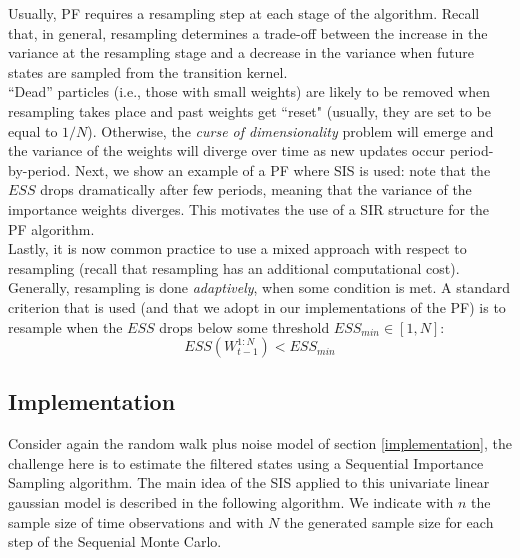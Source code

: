\documentclass[
]{book}
\theoremstyle{break}
\theoremstyle{nonumberplain}
\begin{document}
Usually, PF requires a resampling step at each stage of the algorithm.
Recall that, in general, resampling determines a trade-off between the
increase in the variance at the resampling stage and a decrease in the
variance when future states are sampled from the transition kernel.\\
``Dead'' particles (i.e., those with small weights) are likely to be
removed when resampling takes place and past weights get ``reset"
(usually, they are set to be equal to \(1/N\)). Otherwise, the
\textit{curse of dimensionality} problem will emerge and the variance of
the weights will diverge over time as new updates occur
period-by-period. Next, we show an example of a PF where SIS is used:
note that the \(ESS\) drops dramatically after few periods, meaning that
the variance of the importance weights diverges. This motivates the use
of a SIR structure for the PF algorithm.~\\
Lastly, it is now common practice to use a mixed approach with respect
to resampling (recall that resampling has an additional computational
cost). Generally, resampling is done \textit{adaptively}, when some
condition is met. A standard criterion that is used (and that we adopt
in our implementations of the PF) is to resample when the \(ESS\) drops
below some threshold \(ESS_{min}\in [1,N]\): \begin{equation}
    ESS(W_{t-1}^{1:N})<ESS_{min}
\end{equation}

\subsection{Implementation}

Consider again the random walk plus noise model of section
\ref{implementation}, the challenge here is to estimate the filtered
states using a Sequential Importance Sampling algorithm. The main idea
of the SIS applied to this univariate linear gaussian model is described
in the following algorithm. We indicate with \(n\) the sample size of
time observations and with \(N\) the generated sample size for each step
of the Sequenial Monte Carlo.
\end{document}
